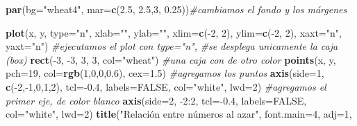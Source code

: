 \documentclass[]{article}
\newenvironment{Shaded}{\begin{snugshade}}{\end{snugshade}}
\newcommand{\KeywordTok}[1]{\textcolor[rgb]{0.13,0.29,0.53}{\textbf{{#1}}}}
\newcommand{\DataTypeTok}[1]{\textcolor[rgb]{0.13,0.29,0.53}{{#1}}}
\newcommand{\DecValTok}[1]{\textcolor[rgb]{0.00,0.00,0.81}{{#1}}}
\newcommand{\FloatTok}[1]{\textcolor[rgb]{0.00,0.00,0.81}{{#1}}}
\newcommand{\StringTok}[1]{\textcolor[rgb]{0.31,0.60,0.02}{{#1}}}
\newcommand{\CommentTok}[1]{\textcolor[rgb]{0.56,0.35,0.01}{\textit{{#1}}}}
\newcommand{\OtherTok}[1]{\textcolor[rgb]{0.56,0.35,0.01}{{#1}}}
\newcommand{\NormalTok}[1]{{#1}}
\begin{document}
\begin{Shaded}
\begin{Highlighting}[]
\KeywordTok{par}\NormalTok{(}\DataTypeTok{bg=}\StringTok{"wheat4"}\NormalTok{, }\DataTypeTok{mar=}\KeywordTok{c}\NormalTok{(}\FloatTok{2.5}\NormalTok{, }\FloatTok{2.5}\NormalTok{,}\DecValTok{3}\NormalTok{, }\FloatTok{0.25}\NormalTok{))}\CommentTok{#cambiamos el fondo y los márgenes}

\KeywordTok{plot}\NormalTok{(x, y, }\DataTypeTok{type=}\StringTok{"n"}\NormalTok{, }\DataTypeTok{xlab=}\StringTok{""}\NormalTok{, }\DataTypeTok{ylab=}\StringTok{""}\NormalTok{, }\DataTypeTok{xlim=}\KeywordTok{c}\NormalTok{(-}\DecValTok{2}\NormalTok{, }\DecValTok{2}\NormalTok{), }
     \DataTypeTok{ylim=}\KeywordTok{c}\NormalTok{(-}\DecValTok{2}\NormalTok{, }\DecValTok{2}\NormalTok{), }\DataTypeTok{xaxt=}\StringTok{"n"}\NormalTok{, }\DataTypeTok{yaxt=}\StringTok{"n"}\NormalTok{) }\CommentTok{#ejecutamos el plot con type="n",}
                                        \CommentTok{#se desplega unicamente la caja (box)}
\KeywordTok{rect}\NormalTok{(-}\DecValTok{3}\NormalTok{, -}\DecValTok{3}\NormalTok{, }\DecValTok{3}\NormalTok{, }\DecValTok{3}\NormalTok{, }\DataTypeTok{col=}\StringTok{"wheat"}\NormalTok{) }\CommentTok{#una caja con de otro color}
\KeywordTok{points}\NormalTok{(x, y, }\DataTypeTok{pch=}\DecValTok{19}\NormalTok{, }\DataTypeTok{col=}\KeywordTok{rgb}\NormalTok{(}\DecValTok{1}\NormalTok{,}\DecValTok{0}\NormalTok{,}\DecValTok{0}\NormalTok{,}\FloatTok{0.6}\NormalTok{), }\DataTypeTok{cex=}\FloatTok{1.5}\NormalTok{) }\CommentTok{#agregamos los puntos}
\KeywordTok{axis}\NormalTok{(}\DataTypeTok{side=}\DecValTok{1}\NormalTok{, }\KeywordTok{c}\NormalTok{(-}\DecValTok{2}\NormalTok{,-}\DecValTok{1}\NormalTok{,}\DecValTok{0}\NormalTok{,}\DecValTok{1}\NormalTok{,}\DecValTok{2}\NormalTok{), }\DataTypeTok{tcl=}\NormalTok{-}\FloatTok{0.4}\NormalTok{, }
     \DataTypeTok{labels=}\OtherTok{FALSE}\NormalTok{, }\DataTypeTok{col=}\StringTok{"white"}\NormalTok{, }\DataTypeTok{lwd=}\DecValTok{2}\NormalTok{) }\CommentTok{#agregamos el primer eje, de color blanco}
\KeywordTok{axis}\NormalTok{(}\DataTypeTok{side=}\DecValTok{2}\NormalTok{, -}\DecValTok{2}\NormalTok{:}\DecValTok{2}\NormalTok{, }\DataTypeTok{tcl=}\NormalTok{-}\FloatTok{0.4}\NormalTok{, }\DataTypeTok{labels=}\OtherTok{FALSE}\NormalTok{, }\DataTypeTok{col=}\StringTok{"white"}\NormalTok{, }\DataTypeTok{lwd=}\DecValTok{2}\NormalTok{) }
\KeywordTok{title}\NormalTok{(}\StringTok{"Relación entre números al azar"}\NormalTok{, }\DataTypeTok{font.main=}\DecValTok{4}\NormalTok{, }\DataTypeTok{adj=}\DecValTok{1}\NormalTok{, }

\end{Highlighting}
\end{Shaded}
\end{document}
